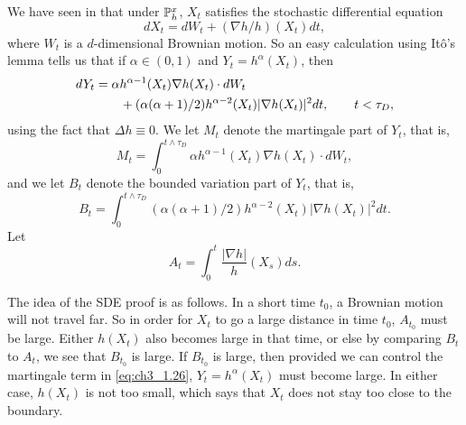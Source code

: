 We have seen in  that under $\P_h^x$, $X_t$ satisfies the stochastic differential equation
\mpagebreak
\begin{equation}\label{eq:ch3_1.25}
    dX_t = dW_t + (\nabla h/h)(X_t)dt,
\end{equation}
where $W_t$ is a $d$-dimensional Brownian motion. So an easy calculation using It\^o's lemma tells us that if $\alpha \in (0,1)$ and $Y_t = h^\alpha(X_t)$, then
\begin{align}\label{eq:ch3_1.26}
    dY_t &= \alpha h^{\alpha-1}(X_t)\nabla h(X_t) \cdot dW_t \\
    &\qquad+ (\alpha(\alpha+1)/2)h^{\alpha-2}(X_t)|\nabla h(X_t)|^2 dt, \qquad t < \tau_D, \notag
\end{align}
using the fact that $\Delta h \equiv 0$. We let $M_t$ denote the martingale part of $Y_t$, that is,
\[
    M_t = \int_0^{t\wedge\tau_D} \alpha h^{\alpha-1}(X_t)\nabla h(X_t) \cdot dW_t,
\]
and we let $B_t$ denote the bounded variation part of $Y_t$, that is,
\[
    B_t = \int_0^{t\wedge\tau_D} (\alpha(\alpha+1)/2)h^{\alpha-2}(X_t)|\nabla h(X_t)|^2 dt.
\]
Let
\[
    A_t = \int_0^t \frac{|\nabla h|}{h}(X_s)ds.
\]

The idea of the SDE proof is as follows. In a short time $t_0$, a Brownian motion will not travel far. So in order for $X_t$ to go a large distance in time $t_0$, $A_{t_0}$ must be large. Either $h(X_t)$ also becomes large in that time, or else by comparing $B_t$ to $A_t$, we see that $B_{t_0}$ is large. If $B_{t_0}$ is large, then provided we can control the martingale term in \eqref{eq:ch3_1.26}, $Y_t = h^\alpha(X_t)$ must become large. In either case, $h(X_t)$ is not too small, which says that $X_t$ does not stay too close to the boundary.


